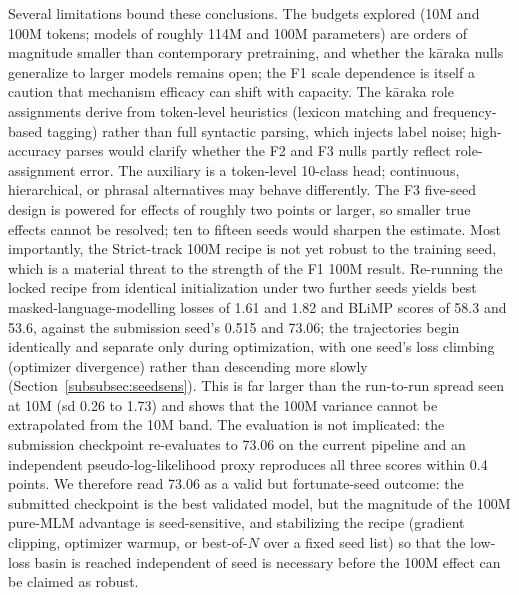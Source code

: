 Several limitations bound these conclusions. The budgets explored (10M and 100M tokens; models of roughly 114M and 100M parameters) are orders of magnitude smaller than contemporary pretraining, and whether the kāraka nulls generalize to larger models remains open; the F1 scale dependence is itself a caution that mechanism efficacy can shift with capacity. The kāraka role assignments derive from token-level heuristics (lexicon matching and frequency-based tagging) rather than full syntactic parsing, which injects label noise; high-accuracy parses would clarify whether the F2 and F3 nulls partly reflect role-assignment error. The auxiliary is a token-level 10-class head; continuous, hierarchical, or phrasal alternatives may behave differently. The F3 five-seed design is powered for effects of roughly two points or larger, so smaller true effects cannot be resolved; ten to fifteen seeds would sharpen the estimate. Most importantly, the Strict-track 100M recipe is not yet robust to the training seed, which is a material threat to the strength of the F1 100M result. Re-running the locked recipe from identical initialization under two further seeds yields best masked-language-modelling losses of 1.61 and 1.82 and BLiMP scores of 58.3 and 53.6, against the submission seed's 0.515 and 73.06; the trajectories begin identically and separate only during optimization, with one seed's loss climbing (optimizer divergence) rather than descending more slowly (Section~\ref{subsubsec:seedsens}). This is far larger than the run-to-run spread seen at 10M (sd 0.26 to 1.73) and shows that the 100M variance cannot be extrapolated from the 10M band. The evaluation is not implicated: the submission checkpoint re-evaluates to 73.06 on the current pipeline and an independent pseudo-log-likelihood proxy reproduces all three scores within 0.4 points. We therefore read 73.06 as a valid but fortunate-seed outcome: the submitted checkpoint is the best validated model, but the magnitude of the 100M pure-MLM advantage is seed-sensitive, and stabilizing the recipe (gradient clipping, optimizer warmup, or best-of-$N$ over a fixed seed list) so that the low-loss basin is reached independent of seed is necessary before the 100M effect can be claimed as robust.
